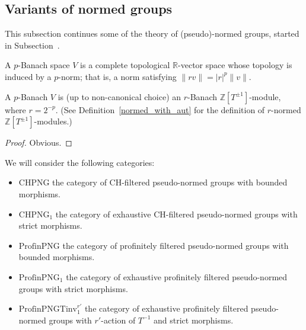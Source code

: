 \subsection{Variants of normed groups}
\label{sec:normed_groups2}

This subsection continues some of the theory of (pseudo)-normed groups,
started in Subsection~\label{sec:normed_groups}.

\begin{definition}
  \label{p-banach}
  \leanok
  A $p$-Banach space $V$ is a complete topological $\mathbb R$-vector space
  whose topology is induced by a $p$-norm;
  that is, a norm satisfying $\|rv\| = |r|^p\|v\|$.
\end{definition}

\begin{lemma}
  \label{p-banach-r-normed}
  \leanok
   A $p$-Banach $V$ is (up to non-canonical choice) an $r$-Banach $\mathbb Z[T^{\pm 1}]$-module, where $r=2^{-p}$.
   (See Definition~\ref{normed_with_aut} for the definition of $r$-normed $\mathbb Z[T^{\pm 1}]$-modules.)
\end{lemma}

\begin{proof}
  \leanok
  Obvious.
\end{proof}

\begin{definition}
  \label{png-cats}
  \leanok
  We will consider the following categories:
  \begin{itemize}
    \item $\text{CHPNG}$ the category of CH-filtered pseudo-normed groups with bounded morphisms.
    \item $\text{CHPNG}_1$ the category of exhaustive CH-filtered pseudo-normed groups with strict morphisms.
    \item $\text{ProfinPNG}$ the category of profinitely filtered pseudo-normed groups with bounded morphisms.
    \item $\text{ProfinPNG}_1$ the category of exhaustive profinitely filtered pseudo-normed groups with strict morphisms.
    \item $\text{ProfinPNGTinv}_1^{r'}$ the category of exhaustive profinitely filtered pseudo-normed groups with $r'$-action of $T^{-1}$ and strict morphisms.
  \end{itemize}
\end{definition}

